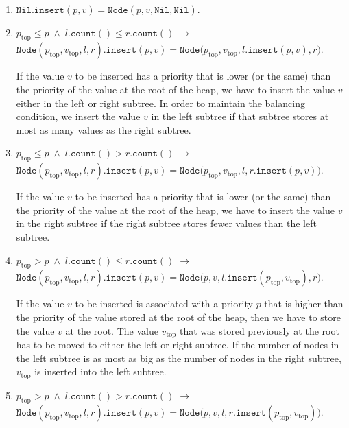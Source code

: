 \begin{enumerate}
\item $\mathtt{Nil}.\mathtt{insert}(p,v) = \mathtt{Node}(p,v,\mathtt{Nil}, \mathtt{Nil})$.
\item $p_{\mathrm{top}} \leq p \;\wedge\; l.\mathtt{count}() \leq r.\mathtt{count}() \;\rightarrow $   \\[0.1cm]
      \hspace*{1.3cm} 
      $\mathtt{Node}(p_{\mathrm{top}},v_\mathrm{top},l,r).\mathtt{insert}(p,v) =
                 \mathtt{Node}\bigl(p_\mathrm{top},v_\mathrm{top},l.\mathtt{insert}(p,v), r\bigr)$.
                 
      If the value $v$ to be inserted has a priority that is lower (or the same) than the priority of
      the value at the root of the heap, we have to insert the value $v$ either in the left or right
      subtree.  In order to maintain the balancing condition, we insert the value $v$ in the left
      subtree if that subtree stores at most as many values as the right subtree.
\item $p_{\mathrm{top}} \leq p \;\wedge\; l.\mathtt{count}() > r.\mathtt{count}() \;\rightarrow $   \\[0.1cm]
      \hspace*{1.3cm} 
      $\mathtt{Node}(p_{\mathrm{top}},v_\mathrm{top},l,r).\mathtt{insert}(p,v) =
                 \mathtt{Node}\bigl(p_\mathrm{top},v_\mathrm{top},l,r.\mathtt{insert}(p,v)\bigr)$.

      If the value $v$ to be inserted has a priority that is lower (or the same) than the priority of
      the value at the root of the heap, we have to insert the value $v$ in the right
      subtree if the right subtree  stores fewer values than the left subtree.
\item $p_{\mathrm{top}} > p \;\wedge\; l.\mathtt{count}() \leq r.\mathtt{count}() \;\rightarrow $ \\[0.1cm]
      \hspace*{1.3cm} 
      $\mathtt{Node}(p_{\mathrm{top}},v_\mathrm{top},l,r).\mathtt{insert}(p,v) =
                 \mathtt{Node}\bigl(p,v,l.\mathtt{insert}(p_\mathrm{top},v_\mathrm{top}), r\bigr)$.

      If the value $v$ to be inserted is associated with a priority $p$ that is higher than the priority of
      the value stored at the root of the heap, then we have to store the value $v$ at the root.
      The value $v_\mathrm{top}$ that was stored previously at the root has to be moved to either
      the left or right subtree.  If the number of nodes in the left subtree is as most as big as
      the number of nodes in the right subtree, $v_\mathrm{top}$ is inserted into the left subtree.
\item $p_{\mathrm{top}} > p \;\wedge\; l.\mathtt{count}() > r.\mathtt{count}() \;\rightarrow $ \\[0.1cm] 
      \hspace*{1.3cm} 
      $\mathtt{Node}(p_{\mathrm{top}},v_\mathrm{top},l,r).\mathtt{insert}(p,v) =
                 \mathtt{Node}\bigl(p,v,l,r.\mathtt{insert}(p_\mathrm{top},v_\mathrm{top})\bigr)$.


\end{enumerate}
